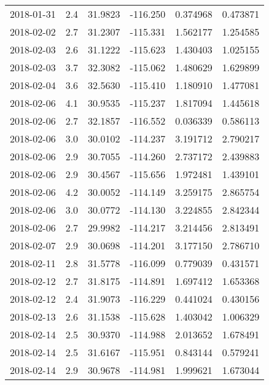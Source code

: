 \begin{tabular}{lrrrrr}
2018-01-31 &       2.4 &  31.9823 &  -116.250 &         0.374968 &         0.473871 \\
2018-02-02 &       2.7 &  31.2307 &  -115.331 &         1.562177 &         1.254585 \\
2018-02-03 &       2.6 &  31.1222 &  -115.623 &         1.430403 &         1.025155 \\
2018-02-03 &       3.7 &  32.3082 &  -115.062 &         1.480629 &         1.629899 \\
2018-02-04 &       3.6 &  32.5630 &  -115.410 &         1.180910 &         1.477081 \\
2018-02-06 &       4.1 &  30.9535 &  -115.237 &         1.817094 &         1.445618 \\
2018-02-06 &       2.7 &  32.1857 &  -116.552 &         0.036339 &         0.586113 \\
2018-02-06 &       3.0 &  30.0102 &  -114.237 &         3.191712 &         2.790217 \\
2018-02-06 &       2.9 &  30.7055 &  -114.260 &         2.737172 &         2.439883 \\
2018-02-06 &       2.9 &  30.4567 &  -115.656 &         1.972481 &         1.439101 \\
2018-02-06 &       4.2 &  30.0052 &  -114.149 &         3.259175 &         2.865754 \\
2018-02-06 &       3.0 &  30.0772 &  -114.130 &         3.224855 &         2.842344 \\
2018-02-06 &       2.7 &  29.9982 &  -114.217 &         3.214456 &         2.813491 \\
2018-02-07 &       2.9 &  30.0698 &  -114.201 &         3.177150 &         2.786710 \\
2018-02-11 &       2.8 &  31.5778 &  -116.099 &         0.779039 &         0.431571 \\
2018-02-12 &       2.7 &  31.8175 &  -114.891 &         1.697412 &         1.653368 \\
2018-02-12 &       2.4 &  31.9073 &  -116.229 &         0.441024 &         0.430156 \\
2018-02-13 &       2.6 &  31.1538 &  -115.628 &         1.403042 &         1.006329 \\
2018-02-14 &       2.5 &  30.9370 &  -114.988 &         2.013652 &         1.678491 \\
2018-02-14 &       2.5 &  31.6167 &  -115.951 &         0.843144 &         0.579241 \\
2018-02-14 &       2.9 &  30.9678 &  -114.981 &         1.999621 &         1.673044 \\

\end{tabular}
